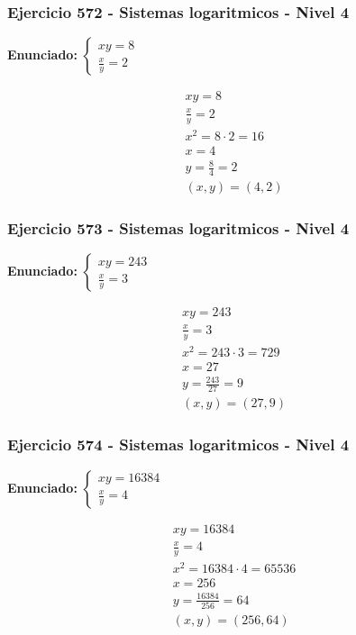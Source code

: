 \documentclass[12pt,a4paper]{article}
\begin{document}
\subsubsection*{Ejercicio 572 - Sistemas logaritmicos - Nivel 4}
\textbf{Enunciado:} \(\begin{cases} xy=8\\ \frac{x}{y}=2\end{cases}\)

\[
\begin{aligned}
xy=8\\
\frac{x}{y}=2\\
x^2=8\cdot 2=16\\
x=4\\
y=\frac{8}{4}=2\\
\boxed{(x,y)=(4,2)}
\end{aligned}
\]


\subsubsection*{Ejercicio 573 - Sistemas logaritmicos - Nivel 4}
\textbf{Enunciado:} \(\begin{cases} xy=243\\ \frac{x}{y}=3\end{cases}\)

\[
\begin{aligned}
xy=243\\
\frac{x}{y}=3\\
x^2=243\cdot 3=729\\
x=27\\
y=\frac{243}{27}=9\\
\boxed{(x,y)=(27,9)}
\end{aligned}
\]


\subsubsection*{Ejercicio 574 - Sistemas logaritmicos - Nivel 4}
\textbf{Enunciado:} \(\begin{cases} xy=16384\\ \frac{x}{y}=4\end{cases}\)

\[
\begin{aligned}
xy=16384\\
\frac{x}{y}=4\\
x^2=16384\cdot 4=65536\\
x=256\\
y=\frac{16384}{256}=64\\
\boxed{(x,y)=(256,64)}
\end{aligned}
\]
\end{document}
